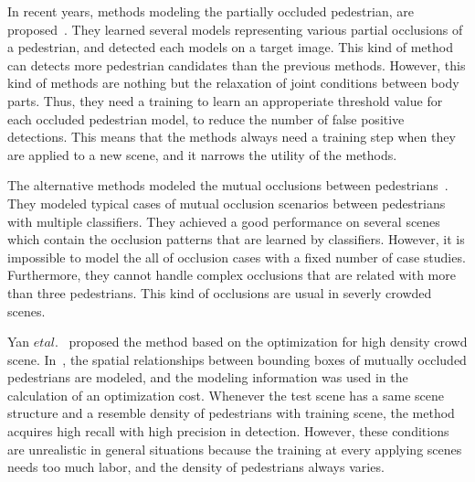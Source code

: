 \documentclass[runningheads]{llncs}
\begin{document}
In recent years, methods modeling the partially occluded pedestrian, are proposed~\cite{ouyang2013modeling, ouyang2013joint}.
They learned several models representing various partial occlusions of a pedestrian, and detected each models on a target image.
This kind of method can detects more pedestrian candidates than the previous methods.
However, this kind of methods are nothing but the relaxation of joint conditions between body parts.
Thus, they need a training to learn an approperiate threshold value for each occluded pedestrian model, to reduce the number of false positive detections.
This means that the methods always need a training step when they are applied to a new scene, and it narrows the utility of the methods.

The alternative methods modeled the mutual occlusions between pedestrians~\cite{ouyang2013single, tang2013learning}.
They modeled typical cases of mutual occlusion scenarios between pedestrians with multiple classifiers.
They achieved a good performance on several scenes which contain the occlusion patterns that are learned by classifiers.
However, it is impossible to model the all of occlusion cases with a fixed number of case studies.
Furthermore, they cannot handle complex occlusions that are related with more than three pedestrians.
This kind of occlusions are usual in severly crowded scenes.

Yan $et al.$~\cite{yan2012multi} proposed the method based on the optimization for high density crowd scene.
In~\cite{yan2012multi}, the spatial relationships between bounding boxes of mutually occluded pedestrians are modeled, and the modeling information was used in the calculation of an optimization cost.
Whenever the test scene has a same scene structure and a resemble density of pedestrians with training scene, the method acquires high recall with high precision in detection.
However, these conditions are unrealistic in general situations because the training at every applying scenes needs too much labor, and the density of pedestrians always varies.
\end{document}
